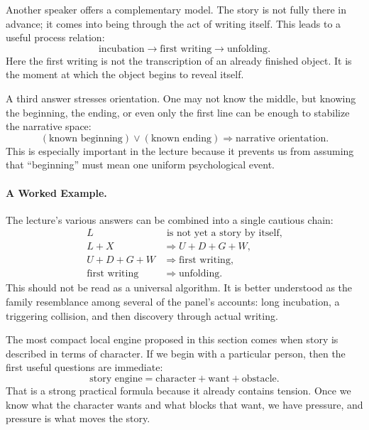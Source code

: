 Another speaker offers a complementary model. The story is not fully there in advance; it comes into being through the act of writing itself. This leads to a useful process relation:
\begin{equation}
\text{incubation} \to \text{first writing} \to \text{unfolding}.
\end{equation}
Here the first writing is not the transcription of an already finished object. It is the moment at which the object begins to reveal itself.

A third answer stresses orientation. One may not know the middle, but knowing the beginning, the ending, or even only the first line can be enough to stabilize the narrative space:
\begin{equation}
(\text{known beginning}) \lor (\text{known ending}) \Rightarrow \text{narrative orientation}.
\end{equation}
This is especially important in the lecture because it prevents us from assuming that ``beginning'' must mean one uniform psychological event.

\paragraph{A Worked Example.} The lecture's various answers can be combined into a single cautious chain:
\begin{align}
L &\text{ is not yet a story by itself},\\
L + X &\Rightarrow U + D + G + W,\\
U + D + G + W &\Rightarrow \text{first writing},\\
\text{first writing} &\Rightarrow \text{unfolding}.
\end{align}
This should not be read as a universal algorithm. It is better understood as the family resemblance among several of the panel's accounts: long incubation, a triggering collision, and then discovery through actual writing.

The most compact local engine proposed in this section comes when story is described in terms of character. If we begin with a particular person, then the first useful questions are immediate:
\begin{equation}
\text{story engine} = \text{character} + \text{want} + \text{obstacle}.
\end{equation}
That is a strong practical formula because it already contains tension. Once we know what the character wants and what blocks that want, we have pressure, and pressure is what moves the story.

